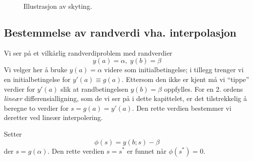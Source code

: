 \begin{figure}[htbp]
\centering
{}
\caption{Illustrasjon av skyting.}
\label{fig:skyting}
\end{figure}



\subsection{Bestemmelse av randverdi vha. interpolasjon} %
\label{sub:bestemme_}
Vi ser på et vilkårlig randverdiproblem med randverdier
\begin{equation}
  y(a) = \alpha, \; y(b) = \beta
\end{equation}
Vi velger her å bruke $y(a)=\alpha$ videre som initialbetingelse; i tillegg trenger vi en initialbetingelse for $y'(a)\equiv g(a)$. Ettersom den ikke er kjent må vi ``tippe'' verdier for $y'(a)$ slik at randbetingelsen $y(b)=\beta$ oppfylles. For en 2. ordens \emph{lineær} differensialligning, som de vi ser på i dette kapittelet, er det tilstrekkelig å beregne to verdier for $s=g(a)=y'(a)$. Den rette verdien bestemmer vi deretter ved lineær interpolering.

Setter
\begin{equation}
  \phi(s) = y(b;s) - \beta \label{eq:phi}
\end{equation}
der $s=g(\alpha)$. Den rette verdien $s=s^*$ er funnet når $\phi(s^*)=0$.

